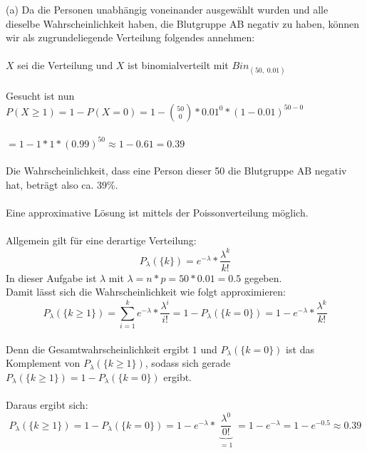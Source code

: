 \documentclass[10pt,a4paper]{article}
\begin{document}
		(a) \quad Da die Personen unabhängig voneinander ausgewählt wurden und alle dieselbe Wahrscheinlichkeit haben, die Blutgruppe AB negativ zu haben, können wir als zugrundeliegende Verteilung folgendes annehmen:
		\\
		\\
		$X$ sei die Verteilung und $X$ ist binomialverteilt mit $Bin_{(50, \; 0.01)}$
		\\
		\\
		Gesucht ist nun $P(X \ge 1) = 1 - P(X=0) = 1 - \binom{50}{0} * 0.01^0 * (1-0.01)^{50-0}$
		\\
		\\
		$= 1 - 1 * 1 * (0.99)^{50} \approx 1 - 0.61 = 0.39$
		\\
		\\
		Die Wahrscheinlichkeit, dass eine Person dieser 50 die Blutgruppe AB negativ hat, beträgt also ca. 39\%.
		\\
		\\
		Eine approximative Lösung ist mittels der Poissonverteilung möglich. 
		\\
		\\
		Allgemein gilt für eine derartige Verteilung:
		\begin{equation}
		\label{poisson_allgemein}
			P_{\lambda}(\{k\})
			= e^{-\lambda} * \frac{\lambda^{k}}{k!}
		\end{equation}
		In dieser Aufgabe ist $\lambda$ mit $\lambda = n*p = 50 * 0.01 = 0.5$ gegeben.
		\\
		Damit lässt sich die Wahrscheinlichkeit wie folgt approximieren:
		\begin{equation}
			\label{poisson_komplement}
			P_{\lambda}(\{k \ge 1\})
			= \sum\limits_{i=1}^{k} e^{-\lambda} * \frac{\lambda^{i}}{i!}
			= 1 - P_{\lambda}(\{k=0\})
			= 1 - e^{-\lambda} * \frac{\lambda^{k}}{k!}
		\end{equation}
		\\
		Denn die Gesamtwahrscheinlichkeit ergibt $1$ und $P_{\lambda}(\{k = 0\})$ ist das Komplement von $P_{\lambda}(\{k \ge 1\})$, sodass sich gerade $P_{\lambda}(\{k \ge 1\}) = 1 - P_{\lambda}(\{k = 0\})$ ergibt.
		\\
		\\
		Daraus ergibt sich:
		\begin{equation*}
			P_{\lambda}(\{k \ge 1\})
			= 1 - P_{\lambda}(\{k = 0\})
			= 1 - e^{-\lambda}
			* \underbrace{\frac{\lambda^{0}}{0!}}_{\substack{=1}} 
			= 1 - e^{-\lambda}
			= 1 - e^{-0.5}
			\approx 0.39
		\end{equation*}
\end{document}
